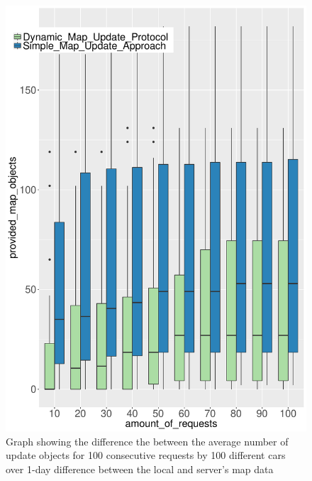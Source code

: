 \begin{figure}
\centering
\includegraphics[scale=.7]{Ttest1DayP.pdf}
\caption{Graph showing the difference the between the average number of update objects for 100 consecutive requests by 100 different cars over 1-day difference between the local and server's map data}
\label{fg:ber1d100}
\end{figure}

